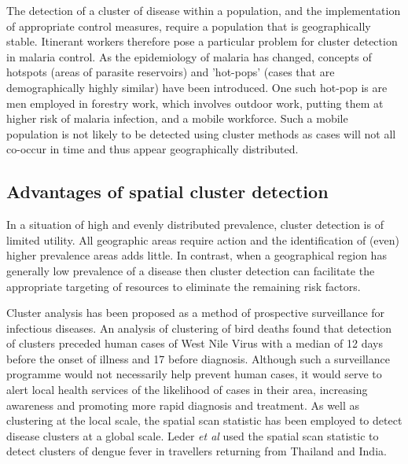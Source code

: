\documentclass[11pt,a4paper]{article}
\begin{document}
The detection of a cluster of disease within a population, and the implementation of appropriate control measures, require a population that is geographically stable. 
Itinerant workers therefore pose a particular problem for cluster detection in malaria control. 
As the epidemiology of malaria has changed, concepts of hotspots (areas of parasite reservoirs) and 'hot-pops' (cases that are demographically highly similar) have been introduced. \cite{Cotter2013}
One such hot-pop is are men employed in forestry work, which involves outdoor work, putting them at higher risk of malaria infection, and a mobile workforce. 
Such a mobile population is not likely to be detected using cluster methods as cases will not all co-occur in time and thus appear geographically distributed. 

\subsection{Advantages of spatial cluster detection}
In a situation of high and evenly distributed prevalence, cluster detection is of limited utility.
All geographic areas require action and the identification of (even) higher prevalence areas adds little.
In contrast, when a geographical region has generally low prevalence of a disease then cluster detection can facilitate the appropriate targeting of resources to eliminate the remaining risk factors. 

Cluster analysis has been proposed as a method of prospective surveillance for infectious diseases.
An analysis of clustering of bird deaths found that detection of clusters preceded human cases of West Nile Virus with a median of 12 days before the onset of illness and 17 before diagnosis. \cite{Mostashari2003}
Although such a surveillance programme would not necessarily help prevent human cases, it would serve to alert local health services of the likelihood of cases in their area, increasing awareness and promoting more rapid diagnosis and treatment. 
As well as clustering at the local scale, the spatial scan statistic has been employed to detect disease clusters at a global scale. 
Leder \textit{et al} used the spatial scan statistic to detect clusters of dengue fever in travellers returning from Thailand and India. \cite{Leder2013}
%


\end{document}
